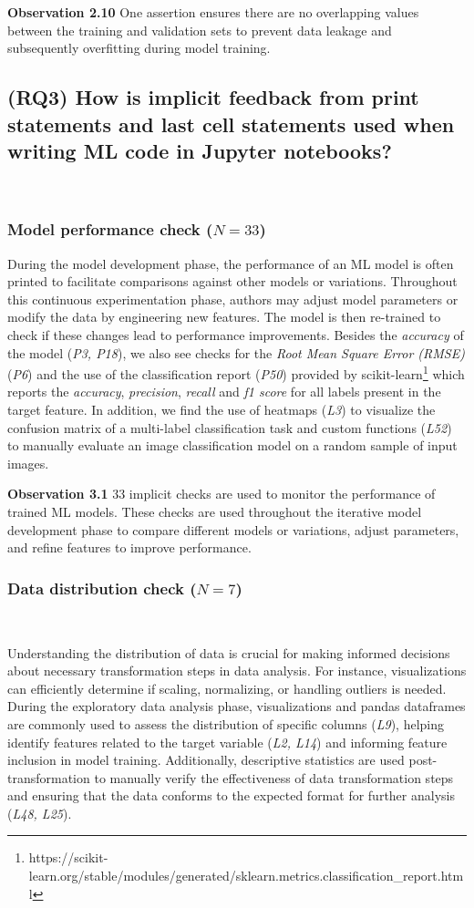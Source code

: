 \documentclass[smallextended]{svjour3}       %
\newcommand{\highlight}[1]{\begin{framed}%
  \noindent#1
\end{framed}}
\begin{document}
\highlight{\textbf{Observation 2.10} One assertion ensures there are no overlapping values between the training and validation sets to prevent data leakage and subsequently overfitting during model training.}

\subsection{(RQ3) How is implicit feedback from print statements and last cell statements used when writing ML code in Jupyter notebooks?}~\label{sec:result-implicit}

\subsubsection{Model performance check ($N = 33$)}

During the model development phase, the performance of an ML model is often printed to facilitate comparisons against other models or variations. Throughout this continuous experimentation phase, authors may adjust model parameters or modify the data by engineering new features. The model is then re-trained to check if these changes lead to performance improvements. Besides the \emph{accuracy} of the model (\emph{P3, P18}), we also see checks for the \emph{Root Mean Square Error (RMSE)} (\emph{P6}) and the use of the classification report (\emph{P50}) provided by scikit-learn\footnote{https://scikit-learn.org/stable/modules/generated/sklearn.metrics.classification\_report.html} which reports the \emph{accuracy}, \emph{precision}, \emph{recall} and \emph{f1 score} for all labels present in the target feature. In addition, we find the use of heatmaps (\emph{L3}) to visualize the confusion matrix of a multi-label classification task and custom functions (\emph{L52}) to manually evaluate an image classification model on a random sample of input images.

\highlight{\textbf{Observation 3.1} 33 implicit checks are used to monitor the performance of trained ML models. These checks are used throughout the iterative model development phase to compare different models or variations, adjust parameters, and refine features to improve performance.}

\subsubsection{Data distribution check ($N = 7$)}~\label{sec:data-distribution-output}

Understanding the distribution of data is crucial for making informed decisions about necessary transformation steps in data analysis. For instance, visualizations can efficiently determine if scaling, normalizing, or handling outliers is needed. During the exploratory data analysis phase, visualizations and pandas dataframes are commonly used to assess the distribution of specific columns (\emph{L9}), helping identify features related to the target variable (\emph{L2, L14}) and informing feature inclusion in model training. Additionally, descriptive statistics are used post-transformation to manually verify the effectiveness of data transformation steps and ensuring that the data conforms to the expected format for further analysis (\emph{L48, L25}).
\end{document}
